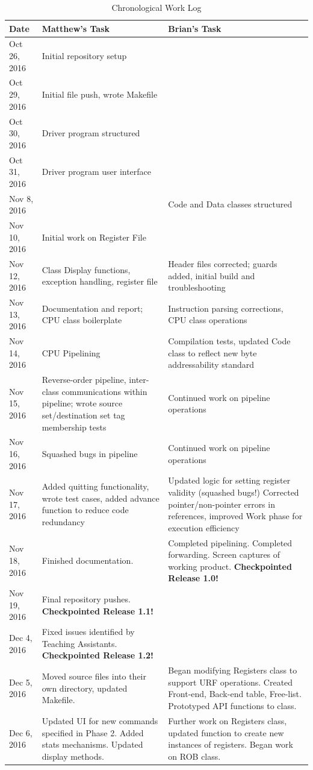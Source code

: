 \documentclass[12pt]{article}
\begin{document}
\begin{table}
  \centering
  \caption{Chronological Work Log}
  \label{tab:worklog}
  \begin{tabular}{l|p{2.75in}|p{2.75in}}
  Date         & Matthew's Task & Brian's Task \\
  \hline
	Oct 26, 2016 & Initial repository setup 				& \\
	Oct 29, 2016 & Initial file push, wrote Makefile 	& \\
	Oct 30, 2016 & Driver program structured 			& \\
	Oct 31, 2016 & Driver program user interface			&  \\
	Nov 8, 2016  & 										& Code and Data classes structured \\
	Nov 10, 2016 & Initial work on Register File			& \\
	Nov 12, 2016 & Class Display functions, exception handling, register file & Header files corrected; guards added, initial build and troubleshooting \\
	Nov 13, 2016 & Documentation and report; CPU class boilerplate & Instruction parsing corrections, CPU class operations \\
	Nov 14, 2016 & CPU Pipelining & Compilation tests, updated Code class to reflect new byte addressability standard \\
	Nov 15, 2016 & Reverse-order pipeline, inter-class communications within pipeline; wrote source set/destination set tag membership tests & Continued work on pipeline operations \\
	Nov 16, 2016 & Squashed bugs in pipeline & Continued work on pipeline operations \\
	Nov 17, 2016 & Added quitting functionality, wrote test cases, added advance function to reduce code redundancy & Updated logic for setting register validity (squashed bugs!) Corrected pointer/non-pointer errors in references, improved Work phase for execution efficiency \\
	Nov 18, 2016 & Finished documentation. & Completed pipelining. Completed forwarding. Screen captures of working product. \textbf{Checkpointed Release 1.0!} \\
	Nov 19, 2016 & Final repository pushes. \textbf{Checkpointed Release 1.1!} & \\
	\hline
	Dec 4, 2016  & Fixed issues identified by Teaching Assistants. \textbf{Checkpointed Release 1.2!} &  \\
	Dec 5, 2016  & Moved source files into their own directory, updated Makefile. & Began modifying Registers class to support URF operations. Created Front-end, Back-end table, Free-list. Prototyped API functions to class. \\
	Dec 6, 2016  & Updated UI for new commands specified in Phase 2. Added stats mechanisms. Updated display methods. & Further work on Registers class, updated function to create new instances of registers. Began work on ROB class. \\

	\end{tabular}
\end{table}
\end{document}
